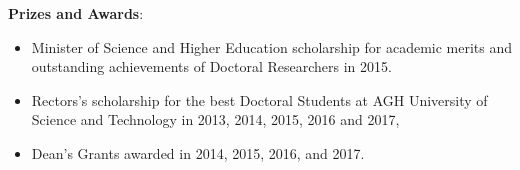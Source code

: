 \noindent \textbf{Prizes and Awards}:
\begin{itemize}[nosep]
\item Minister of Science and Higher Education scholarship for academic merits and outstanding achievements of Doctoral Researchers in 2015.
\item Rectors’s scholarship for the best Doctoral Students at AGH University of Science and Technology in 2013, 2014, 2015, 2016 and 2017,
\item Dean's Grants awarded in 2014, 2015, 2016, and 2017.
\end{itemize}
\vspace*{1cm} %

\cleardoublepage